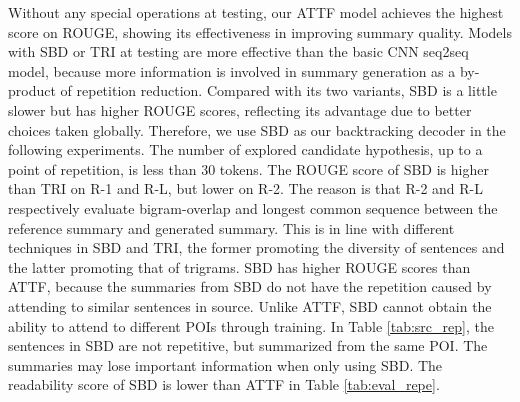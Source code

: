 \documentclass{nle}
\theoremstyle{definition}
\newcommand{\tabref}[1]{Table \ref{#1}}
\begin{document}
Without any special operations at testing, 
our ATTF model achieves the highest score on ROUGE, showing
its effectiveness in improving summary quality.
Models with SBD or TRI at testing
are more effective than the basic CNN seq2seq model,
because more information is involved in summary generation 
as a by-product of repetition reduction.
Compared with its two variants, SBD is a little slower 
but has higher ROUGE scores, reflecting its advantage due to
better choices taken globally.
Therefore, 
we use SBD as our backtracking decoder in the following experiments. 
The number of explored candidate hypothesis, up to a point of
repetition, is less than 30 tokens.
The ROUGE score of SBD is higher than TRI on R-1 and R-L, but lower on R-2. 
The reason is that R-2 and R-L respectively evaluate
bigram-overlap and longest common sequence between the reference
summary and generated summary. This is in line with different techniques 
in SBD and TRI, the former promoting the diversity of sentences and 
the latter promoting that of trigrams.
SBD has higher ROUGE scores than ATTF, 
because the summaries from
SBD do not have the repetition caused by attending to similar sentences in source.
Unlike ATTF, 
SBD cannot obtain the ability to attend to different POIs through training.
In \tabref{tab:src_rep}, the sentences in SBD are not repetitive, 
but summarized from the same POI.
The summaries may lose important information when only using SBD.
The readability score of SBD is lower than ATTF in \tabref{tab:eval_repe}.
\end{document}
